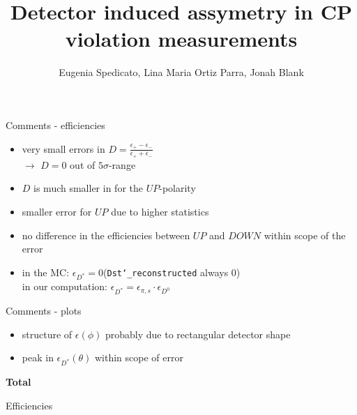 \documentclass[11pt]{beamer}
\author{Eugenia Spedicato, Lina Maria Ortiz Parra, Jonah Blank}
\title{Detector induced assymetry in CP violation measurements}
\begin{document}
\begin{frame}
\titlepage
\end{frame}


\begin{frame}{Comments - efficiencies}
\begin{itemize}
\item very small errors in $D=\frac{\epsilon_+ - \epsilon_-}{\epsilon_+ + \epsilon_-}$\\
$\rightarrow$ $D=0$ out of $5\sigma$-range
\item $D$ is much smaller in for the $UP$-polarity
\item smaller error for $UP$ due to higher statistics
\item no difference in the efficiencies between $UP$ and $DOWN$ within scope of the error
\item in the MC: $\epsilon_{D^*}=0$(\texttt{Dst\char`_reconstructed} always 0)\\
in our computation: $\epsilon_{D^*}=\epsilon_{\pi,s}\cdot\epsilon_{D^0}$
\end{itemize}
\end{frame}
\begin{frame}{Comments - plots}
\begin{itemize}
\item structure of $\epsilon(\phi)$ probably due to rectangular detector shape
\item peak in $\epsilon_{D^*}(\theta)$ within scope of error
\end{itemize}
\end{frame}
\begin{frame}
\begin{LARGE}
\textbf{Total}
\end{LARGE}
\end{frame}
\begin{frame}{Efficiencies}
\begin{table}
\end{table}
\end{frame}
\end{document}
